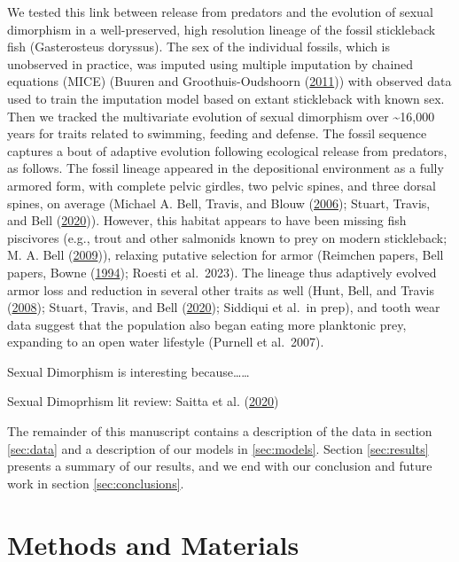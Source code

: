 \documentclass[
  12pt,
]{article}
\begin{document}
We tested this link between release from predators and the evolution of
sexual dimorphism in a well-preserved, high resolution lineage of the
fossil stickleback fish (Gasterosteus doryssus). The sex of the
individual fossils, which is unobserved in practice, was imputed using
multiple imputation by chained equations (MICE) (Buuren and
Groothuis-Oudshoorn (\protect\hyperlink{ref-MICE}{2011})) with observed
data used to train the imputation model based on extant stickleback with
known sex. Then we tracked the multivariate evolution of sexual
dimorphism over \textasciitilde16,000 years for traits related to
swimming, feeding and defense. The fossil sequence captures a bout of
adaptive evolution following ecological release from predators, as
follows. The fossil lineage appeared in the depositional environment as
a fully armored form, with complete pelvic girdles, two pelvic spines,
and three dorsal spines, on average (Michael A. Bell, Travis, and Blouw
(\protect\hyperlink{ref-Bell2006}{2006}); Stuart, Travis, and Bell
(\protect\hyperlink{ref-Stuart2020}{2020})). However, this habitat
appears to have been missing fish piscivores (e.g., trout and other
salmonids known to prey on modern stickleback; M. A. Bell
(\protect\hyperlink{ref-Bell2009}{2009})), relaxing putative selection
for armor (Reimchen papers, Bell papers, Bowne
(\protect\hyperlink{ref-Bowne1994}{1994}); Roesti et al.~2023). The
lineage thus adaptively evolved armor loss and reduction in several
other traits as well (Hunt, Bell, and Travis
(\protect\hyperlink{ref-Hunt2008}{2008}); Stuart, Travis, and Bell
(\protect\hyperlink{ref-Stuart2020}{2020}); Siddiqui et al.~in prep),
and tooth wear data suggest that the population also began eating more
planktonic prey, expanding to an open water lifestyle (Purnell et
al.~2007).

Sexual Dimorphism is interesting because\ldots\ldots{}

Sexual Dimoprhism lit review: Saitta et al.
(\protect\hyperlink{ref-SaittaEtAl2020}{2020})

The remainder of this manuscript contains a description of the data in
section \ref{sec:data} and a description of our models in
\ref{sec:models}. Section \ref{sec:results} presents a summary of our
results, and we end with our conclusion and future work in section
\ref{sec:conclusions}.

\hypertarget{methods-and-materials}{%
\section{Methods and Materials}\label{methods-and-materials}}
\end{document}
